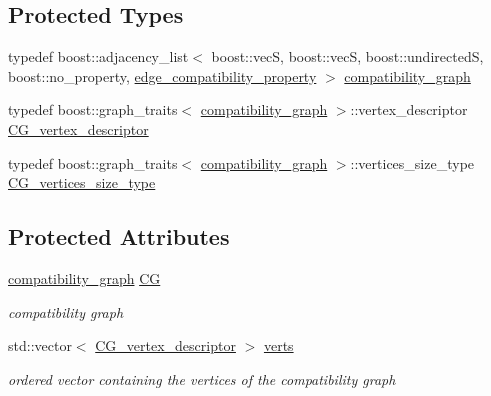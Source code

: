 \subsection*{Protected Types}
\begin{DoxyCompactItemize}
\item 
typedef boost\+::adjacency\+\_\+list$<$ boost\+::vecS, boost\+::vecS, boost\+::undirectedS, boost\+::no\+\_\+property, \hyperlink{structcompatibility__based__register_1_1edge__compatibility__property}{edge\+\_\+compatibility\+\_\+property} $>$ \hyperlink{classcompatibility__based__register_a8d196f6310dd913b6b53ffbbbd7e76d8}{compatibility\+\_\+graph}
\item 
typedef boost\+::graph\+\_\+traits$<$ \hyperlink{classcompatibility__based__register_a8d196f6310dd913b6b53ffbbbd7e76d8}{compatibility\+\_\+graph} $>$\+::vertex\+\_\+descriptor \hyperlink{classcompatibility__based__register_aed04e2ea7e7883f7874e088d875f5679}{C\+G\+\_\+vertex\+\_\+descriptor}
\item 
typedef boost\+::graph\+\_\+traits$<$ \hyperlink{classcompatibility__based__register_a8d196f6310dd913b6b53ffbbbd7e76d8}{compatibility\+\_\+graph} $>$\+::vertices\+\_\+size\+\_\+type \hyperlink{classcompatibility__based__register_a67a4eaed3a0abaefa5bced1d77e58190}{C\+G\+\_\+vertices\+\_\+size\+\_\+type}
\end{DoxyCompactItemize}
\subsection*{Protected Attributes}
\begin{DoxyCompactItemize}
\item 
\hyperlink{classcompatibility__based__register_a8d196f6310dd913b6b53ffbbbd7e76d8}{compatibility\+\_\+graph} \hyperlink{classcompatibility__based__register_afeb1557ddc05b2c590799373a22dbd82}{CG}
\begin{DoxyCompactList}\small\item\em compatibility graph \end{DoxyCompactList}\item 
std\+::vector$<$ \hyperlink{classcompatibility__based__register_aed04e2ea7e7883f7874e088d875f5679}{C\+G\+\_\+vertex\+\_\+descriptor} $>$ \hyperlink{classcompatibility__based__register_a97287449fdce0d9822269c5f2ba444e4}{verts}
\begin{DoxyCompactList}\small\item\em ordered vector containing the vertices of the compatibility graph \end{DoxyCompactList}\end{DoxyCompactItemize}
